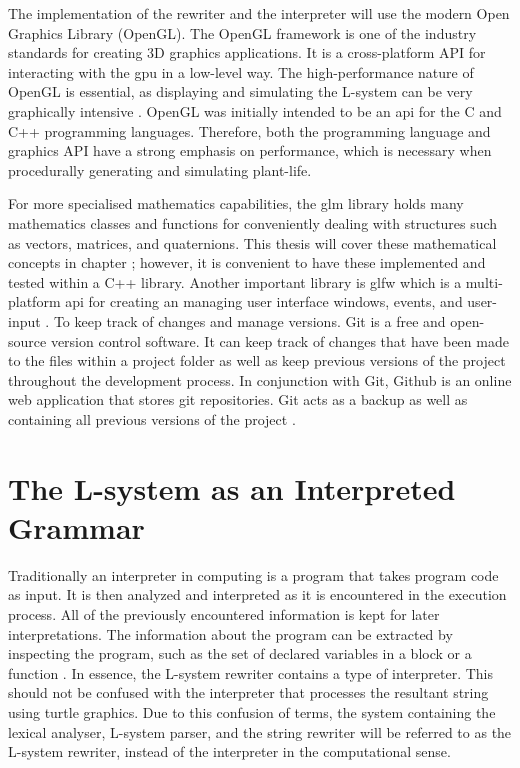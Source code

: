 The implementation of the rewriter and the interpreter will use the modern Open Graphics Library (\gls{OpenGL}). The OpenGL framework is one of the industry standards for creating 3D graphics applications. It is a cross-platform API for interacting with the \acrshort{gpu} in a low-level way. The high-performance nature of OpenGL is essential, as displaying and simulating the L-system can be very graphically intensive \cite{sellers2013opengl} \cite{movania2017opengl}. OpenGL was initially intended to be an \acrshort{api} for the C and C++ programming languages. Therefore, both the programming language and graphics API have a strong emphasis on performance, which is necessary when procedurally generating and simulating plant-life.

For more specialised mathematics capabilities, the \acrfull{glm} library holds many mathematics classes and functions for conveniently dealing with structures such as vectors, matrices, and quaternions. This thesis will cover these mathematical concepts in chapter \label{maths chapter}; however, it is convenient to have these implemented and tested within a C++ library. Another important library is \acrfull{glfw} which is a multi-platform \acrshort{api} for creating an managing user interface windows, events, and user-input \cite{glfwDocumentation}. To keep track of changes and manage versions. Git is a free and open-source version control software. It can keep track of changes that have been made to the files within a project folder as well as keep previous versions of the project throughout the development process. In conjunction with Git,  Github is an online web application that stores git repositories. Git acts as a backup as well as containing all previous versions of the project \cite{torvalds}.

\section{The L-system as an Interpreted Grammar}

Traditionally an interpreter in computing is a program that takes program code as input. It is then analyzed and interpreted as it is encountered in the execution process. All of the previously encountered information is kept for later interpretations. The information about the program can be extracted by inspecting the program, such as the set of declared variables in a block or a function \cite{wilhelm2010compiler}. In essence, the L-system rewriter contains a type of interpreter. This should not be confused with the interpreter that processes the resultant string using turtle graphics. Due to this confusion of terms, the system containing the lexical analyser, L-system parser, and the string rewriter will be referred to as the L-system rewriter, instead of the interpreter in the computational sense. 

